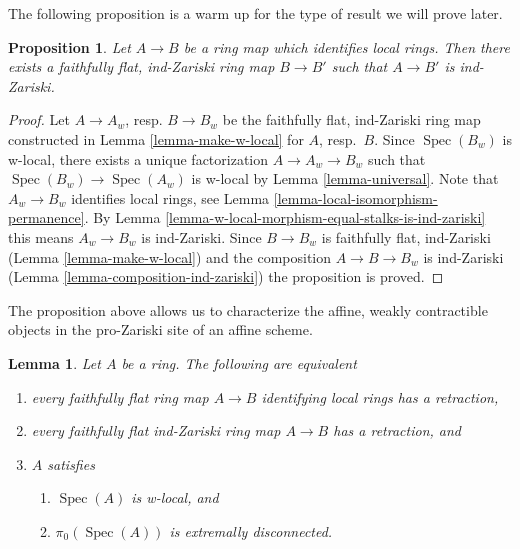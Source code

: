 \documentclass{stacks-project}
\theoremstyle{plain}
\newtheorem{proposition}[subsection]{Proposition}
\newtheorem{lemma}[subsection]{Lemma}
\theoremstyle{definition}
\theoremstyle{remark}
\numberwithin{equation}{subsection}
\def\Spec{\mathop{\mathrm{Spec}}}
\begin{document}
\noindent
The following proposition is a warm up for the type of result
we will prove later.

\begin{proposition}
\label{proposition-maps-wich-identify-local-rings}
Let $A \to B$ be a ring map which identifies local rings.
Then there exists a faithfully flat, ind-Zariski ring map
$B \to B'$ such that $A \to B'$ is ind-Zariski.
\end{proposition}

\begin{proof}
Let $A \to A_w$, resp. $B \to B_w$ be the faithfully flat, ind-Zariski ring
map constructed in Lemma \ref{lemma-make-w-local} for $A$, resp.\ $B$.
Since $\Spec(B_w)$ is w-local, there exists a unique factorization
$A \to A_w \to B_w$ such that $\Spec(B_w) \to \Spec(A_w)$ is w-local
by Lemma \ref{lemma-universal}. Note that $A_w \to B_w$ identifies
local rings, see
Lemma \ref{lemma-local-isomorphism-permanence}.
By Lemma \ref{lemma-w-local-morphism-equal-stalks-is-ind-zariski}
this means $A_w \to B_w$ is ind-Zariski. Since $B \to B_w$ is
faithfully flat, ind-Zariski (Lemma \ref{lemma-make-w-local})
and the composition $A \to B \to B_w$ is ind-Zariski
(Lemma \ref{lemma-composition-ind-zariski})
the proposition is proved.
\end{proof}

\noindent
The proposition above allows us to characterize the affine, weakly contractible
objects in the pro-Zariski site of an affine scheme.

\begin{lemma}
\label{lemma-w-local-extremally-disconnected}
Let $A$ be a ring. The following are equivalent
\begin{enumerate}
\item every faithfully flat ring map $A \to B$ identifying local rings
has a retraction,
\item every faithfully flat ind-Zariski ring map $A \to B$ has a retraction, and
\item $A$ satisfies
\begin{enumerate}
\item $\Spec(A)$ is w-local, and
\item $\pi_0(\Spec(A))$ is extremally disconnected.
\end{enumerate}
\end{enumerate}
\end{lemma}
\end{document}
